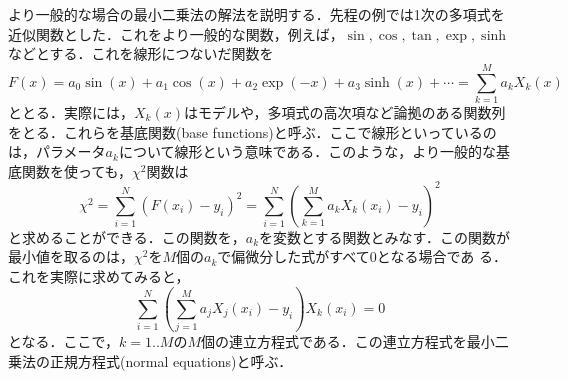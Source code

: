 より一般的な場合の最小二乗法の解法を説明する．先程の例では1次の多項式を近似関数とした．これをより一般的な関数，例えば，$\sin, \cos, \tan, \exp, \sinh$などとする．これを線形につないだ関数を
\begin{equation*}
F \left(x \right)=a _{0}\sin \left(x \right)+a _{1}\cos \left(x \right)+a _{2}\exp \left(-x \right)+a _{3}\sinh \left(x \right)+\cdots ={\sum_{k=1}^{M}}a _{k }X _{k }\left(x \right)
\end{equation*}
ととる．実際には，$X_k(x)$はモデルや，多項式の高次項など論拠のある関数列をとる．これらを基底関数(base functions)と呼ぶ．ここで線形といっているのは，パラメータ$a_k$について線形という意味である．このような，より一般的な基底関数を使っても，$\chi^2$関数は
\begin{equation*}
{\chi}^{2}=\sum _{i=1}^{N} \left( F \left( x_{{i}} \right) -y_{{i}} \right) ^{2}
=\sum _{i=1}^{N} \left( \sum _{k=1}^{M}a_{{k}}X_{{k}} \left( x_{{i}} \right) -y_{{i}} \right) ^{2}
\end{equation*}
と求めることができる．この関数を，$a_k$を変数とする関数とみなす．この関数が最小値を取るのは，$\chi^2$を$M$個の$a_k$で偏微分した式がすべて0となる場合であ
る．これを実際に求めてみると，
\begin{equation*}
\sum _{i=1}^{N} \left( \sum _{j=1}^{M}a_{{j}}X_{{j}} \left( x_{{i}} \right) -y_{{i}} \right) X_{{k}} \left( x_{{i}} \right) =0
\end{equation*}
となる．ここで，$k = 1..M$の$M$個の連立方程式である．この連立方程式を最小二乗法の正規方程式(normal equations)と呼ぶ．

